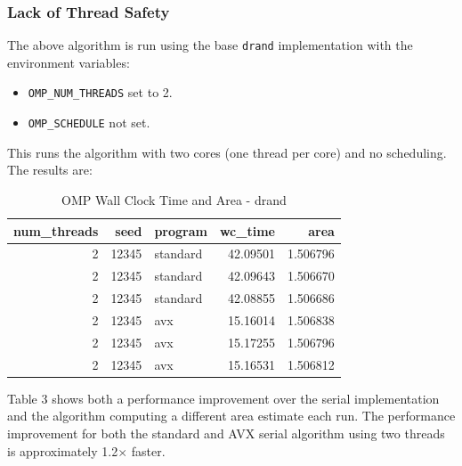 \documentclass{article}
\begin{document}
\subsubsection{Lack of Thread Safety}
The above algorithm is run using the base \texttt{drand} implementation with the environment variables:
\begin{itemize}
   \item \texttt{OMP\_NUM\_THREADS} set to 2.
   \item \texttt{OMP\_SCHEDULE} not set.
\end{itemize}
This runs the algorithm with two cores (one thread per core) and no scheduling. The results are:
\begin{table}[H]
    \centering
    \caption{OMP Wall Clock Time and Area - drand}
    \centering
    \fontsize{12}{14}\selectfont
    \begin{tabular}[t]{r|r|l|r|r}
    \hline
    num\_threads & seed & program & wc\_time & area\\
    \hline
    2 & 12345 & standard & 42.09501 & 1.506796\\
    \hline
    2 & 12345 & standard & 42.09643 & 1.506670\\
    \hline
    2 & 12345 & standard & 42.08855 & 1.506686\\
    \hline
    2 & 12345 & avx & 15.16014 & 1.506838\\
    \hline
    2 & 12345 & avx & 15.17255 & 1.506796\\
    \hline
    2 & 12345 & avx & 15.16531 & 1.506812\\
    \hline
    \end{tabular}
\end{table}
\noindent Table 3 shows both a performance improvement over the serial implementation and 
the algorithm computing a different area estimate each run. The performance improvement for 
both the standard and AVX serial algorithm using two threads is approximately 1.2$\times$ faster.
\end{document}
